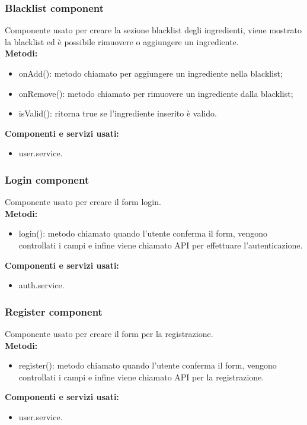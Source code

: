\subsubsection{Blacklist component}
Componente usato per creare la sezione blacklist degli ingredienti, viene mostrato la blacklist ed è possibile rimuovere o aggiungere un ingrediente.\\
\textbf{Metodi:}
\begin{itemize}
    \item onAdd(): metodo chiamato per aggiungere un ingrediente nella blacklist;
    \item onRemove(): metodo chiamato per rimuovere un ingrediente dalla blacklist;
    \item isValid(): ritorna true se l'ingrediente inserito è valido.
\end{itemize}
\textbf{Componenti e servizi usati:}
\begin{itemize}
    \item user.service.
\end{itemize}

\subsubsection{Login component}
Componente usato per creare il form login.\\
\textbf{Metodi:}
\begin{itemize}
    \item login(): metodo chiamato quando l'utente conferma il form, vengono controllati i campi e infine viene chiamato API per effettuare l'autenticazione.
\end{itemize}
\textbf{Componenti e servizi usati:}
\begin{itemize}
    \item auth.service.
\end{itemize}

\subsubsection{Register component}
Componente usato per creare il form per la registrazione.\\
\textbf{Metodi:}
\begin{itemize}
    \item register(): metodo chiamato quando l'utente conferma il form, vengono controllati i campi e infine viene chiamato API per la registrazione.
\end{itemize}
\textbf{Componenti e servizi usati:}
\begin{itemize}
    \item user.service.
\end{itemize}

